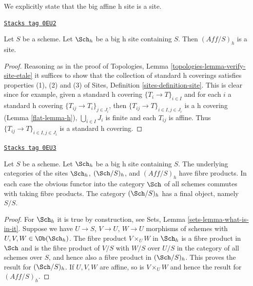 We explicitly state that the big affine h site is a site.

\begin{lemma}
\label{flat-lemma-verify-site-h}
\href{https://stacks.math.columbia.edu/tag/0EU2}{\texttt{Stacks tag 0EU2}}

Let $S$ be a scheme. Let $\Sch_h$ be a big h
site containing $S$. Then $(\textit{Aff}/S)_h$ is a site.
\end{lemma}

\begin{proof}

Reasoning as in the proof of
Topologies, Lemma \ref{topologies-lemma-verify-site-etale}
it suffices to show that the collection of standard h coverings
satisfies properties (1), (2) and (3) of
Sites, Definition \ref{sites-definition-site}.
This is clear since for example, given a standard h covering
$\{T_i \to T\}_{i\in I}$ and for each
$i$ a standard h covering $\{T_{ij} \to T_i\}_{j \in J_i}$, then
$\{T_{ij} \to T\}_{i \in I, j\in J_i}$ is a h covering
(Lemma \ref{flat-lemma-h}), $\bigcup_{i\in I} J_i$ is finite and
each $T_{ij}$ is affine. Thus $\{T_{ij} \to T\}_{i \in I, j\in J_i}$
is a standard h covering.
\end{proof}

\begin{lemma}
\label{flat-lemma-fibre-products-h}
\href{https://stacks.math.columbia.edu/tag/0EU3}{\texttt{Stacks tag 0EU3}}

Let $S$ be a scheme. Let $\Sch_h$ be a big h
site containing $S$. The underlying categories of the sites
$\Sch_h$, $(\Sch/S)_h$, and $(\textit{Aff}/S)_h$ have fibre products.
In each case the obvious functor into the category $\Sch$ of
all schemes commutes with taking fibre products. The category
$(\Sch/S)_h$ has a final object, namely $S/S$.
\end{lemma}

\begin{proof}
For $\Sch_h$ it is true by construction, see
Sets, Lemma \ref{sets-lemma-what-is-in-it}.
Suppose we have $U \to S$, $V \to U$, $W \to U$ morphisms
of schemes with $U, V, W \in \Ob(\Sch_h)$.
The fibre product $V \times_U W$ in $\Sch_h$
is a fibre product in $\Sch$ and
is the fibre product of $V/S$ with $W/S$ over $U/S$ in
the category of all schemes over $S$, and hence also a
fibre product in $(\Sch/S)_h$.
This proves the result for $(\Sch/S)_h$.
If $U, V, W$ are affine, so is $V \times_U W$ and hence the
result for $(\textit{Aff}/S)_h$.
\end{proof}

